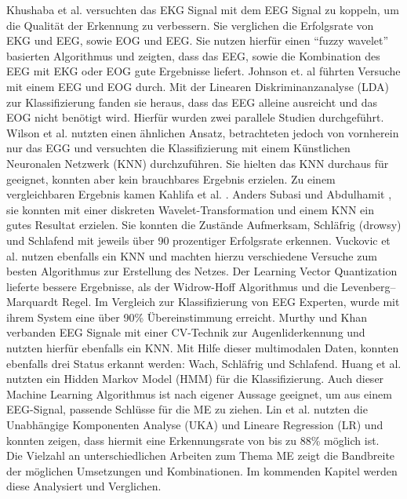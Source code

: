 {Khushaba et al. \cite{Khushaba_5580017} versuchten das EKG Signal mit dem EEG Signal zu koppeln, um die Qualität der Erkennung zu verbessern. Sie verglichen die Erfolgsrate von EKG und EEG, sowie EOG und EEG. Sie nutzen hierfür einen "`fuzzy wavelet"' basierten Algorithmus und zeigten, dass das EEG, sowie die Kombination des EEG mit EKG oder EOG gute Ergebnisse liefert. Johnson et. al \cite{Johnson11} führten Versuche mit einem EEG und EOG durch. Mit der Linearen Diskriminanzanalyse (LDA) zur Klassifizierung fanden sie heraus, dass das EEG alleine ausreicht und das EOG nicht benötigt wird. Hierfür wurden zwei parallele Studien durchgeführt. Wilson et al. \cite{wilson_890161} nutzten einen ähnlichen Ansatz, betrachteten jedoch von vornherein nur das EGG und versuchten die Klassifizierung mit einem Künstlichen Neuronalen Netzwerk (KNN) durchzuführen. Sie hielten das KNN durchaus für geeignet, konnten aber kein brauchbares Ergebnis erzielen. Zu einem vergleichbaren Ergebnis kamen Kahlifa et al. \cite{khalifa_893852}. Anders Subasi und Abdulhamit \cite{Subasi:2005:ARA:1707423.1707550}, sie konnten mit einer diskreten Wavelet-Transformation und einem KNN ein gutes Resultat erzielen. Sie konnten die Zustände Aufmerksam, Schläfrig (drowsy) und Schlafend mit jeweils über 90 prozentiger Erfolgsrate erkennen. Vuckovic et al. \cite{Vuckovic2002349} nutzen ebenfalls ein KNN und machten hierzu verschiedene Versuche zum besten Algorithmus zur Erstellung des Netzes. Der Learning Vector Quantization lieferte bessere Ergebnisse, als der Widrow-Hoff Algorithmus und die Levenberg–Marquardt Regel. Im Vergleich zur Klassifizierung von EEG Experten, wurde mit ihrem System  eine über 90\% Übereinstimmung erreicht. Murthy und Khan \cite{Murthy_1} verbanden EEG Signale mit einer CV-Technik zur Augenliderkennung und nutzten hierfür ebenfalls ein KNN. Mit Hilfe dieser multimodalen Daten, konnten ebenfalls drei Status erkannt werden: Wach, Schläfrig und Schlafend.
Huang et al. \cite{Huang_548971} nutzten ein Hidden Markov Model (HMM) für die Klassifizierung. Auch dieser Machine Learning Algorithmus ist nach eigener Aussage geeignet, um aus einem EEG-Signal, passende Schlüsse für die \acl{ME} zu ziehen. Lin et al. \cite{Lin05eeg-baseddrowsiness} nutzten die Unabhängige Komponenten Analyse (UKA) und Lineare Regression (LR) und konnten zeigen, dass hiermit eine Erkennungsrate von bis zu 88\% möglich ist.\\

Die Vielzahl an unterschiedlichen Arbeiten zum Thema \acl{ME} zeigt die Bandbreite der möglichen Umsetzungen und Kombinationen. Im kommenden Kapitel werden diese Analysiert und Verglichen.

}
